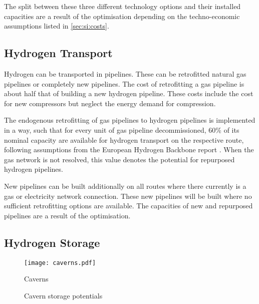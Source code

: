 The split between these three different technology
options and their installed capacities are a result of the optimisation
depending on the techno-economic assumptions listed in \cref{sec:si:costs}.

\subsection{Hydrogen Transport}
\label{sec:si:h2:transport}

Hydrogen can be transported in pipelines. These can be retrofitted natural gas
pipelines or completely new pipelines. The cost of retrofitting a gas pipeline
is about half that of building a new hydrogen pipeline. These costs include the
cost for new compressors but neglect the energy demand for compression.

The endogenous retrofitting of gas pipelines to hydrogen pipelines is
implemented in a way, such that for every unit of gas pipeline decommissioned,
60\% of its nominal capacity are available for hydrogen transport on the
respective route, following assumptions from the European Hydrogen Backbone
report . When the gas network is not resolved, this
value denotes the potential for repurposed hydrogen pipelines.

New pipelines can be built additionally on all routes where there currently is a
gas or electricity network connection. These new pipelines will be built where
no sufficient retrofitting options are available. The capacities of new and
repurposed pipelines are a result of the optimisation.

\subsection{Hydrogen Storage}
\label{sec:si:h2:storage}

\begin{SCfigure}
    \centering
    \texttt{[image: caverns.pdf]}
    \caption{Caverns}
    \label{fig:caverns}
\end{SCfigure}

\begin{figure}
    \centering
    \caption{Cavern storage potentials}
    \label{fig:clustered-caverns}
\end{figure}

